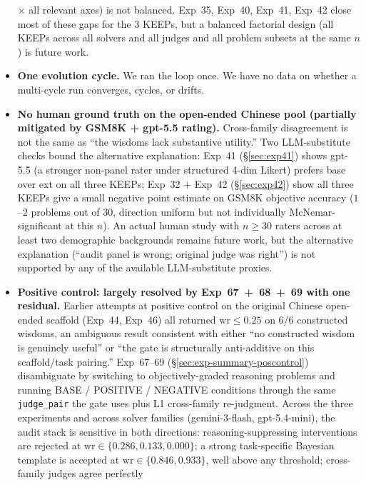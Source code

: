 \documentclass{article}
\begin{document}
\begin{CJK*}{UTF8}{gbsn}
\begin{itemize}[leftmargin=*,topsep=2pt,itemsep=2pt]
    \(\times\) all relevant axes) is not balanced. Exp~35,
    Exp~40, Exp~41, Exp~42 close most of these gaps for the 3
    KEEPs, but a balanced factorial design (all KEEPs across
    all solvers and all judges and all problem subsets at the
    same \(n\)) is future work.
  \item \textbf{One evolution cycle.} We ran the loop once. We
    have no data on whether a multi-cycle run converges, cycles,
    or drifts.
  \item \textbf{No human ground truth on the open-ended Chinese
    pool (partially mitigated by GSM8K + gpt-5.5 rating).}
    Cross-family disagreement is not the same as
    ``the wisdoms lack substantive utility.'' Two
    LLM-substitute checks bound the alternative explanation:
    Exp~41 (\S\ref{sec:exp41}) shows gpt-5.5 (a stronger
    non-panel rater under structured 4-dim Likert) prefers base
    over ext on all three KEEPs; Exp~32 + Exp~42
    (\S\ref{sec:exp42}) show all three KEEPs give a small
    negative point estimate on GSM8K objective accuracy
    (\(1\)--\(2\) problems out of 30, direction uniform but not
    individually McNemar-significant at this \(n\)). An
    actual human study with \(n \geq 30\) raters across at
    least two demographic backgrounds remains future work, but
    the alternative explanation (``audit panel is wrong; original
    judge was right'') is not supported by any of the available
    LLM-substitute proxies.
  \item \textbf{Positive control: largely resolved by
    Exp~67~+~68~+~69 with one residual.}
    Earlier attempts at positive control on the original Chinese
    open-ended scaffold (Exp~44, Exp~46) all returned
    \(\mathrm{wr} \leq 0.25\) on \(6/6\) constructed wisdoms, an
    ambiguous result consistent with either ``no constructed
    wisdom is genuinely useful'' or ``the gate is structurally
    anti-additive on this scaffold/task pairing.''
    Exp~67--69 (\S\ref{sec:exp-summary-poscontrol}) disambiguate
    by switching to objectively-graded reasoning problems and
    running BASE / POSITIVE / NEGATIVE conditions through the
    same \texttt{judge\_pair} the gate uses plus L1 cross-family
    re-judgment. Across the three experiments and across
    solver families (gemini-3-flash, gpt-5.4-mini), the audit
    stack is sensitive in both directions: reasoning-suppressing
    interventions are rejected at
    \(\mathrm{wr} \in \{0.286, 0.133, 0.000\}\); a strong
    task-specific Bayesian template is accepted at
    \(\mathrm{wr} \in \{0.846, 0.933\}\), well above any
    threshold; cross-family judges agree perfectly

\end{itemize}
\end{CJK*}
\end{document}
